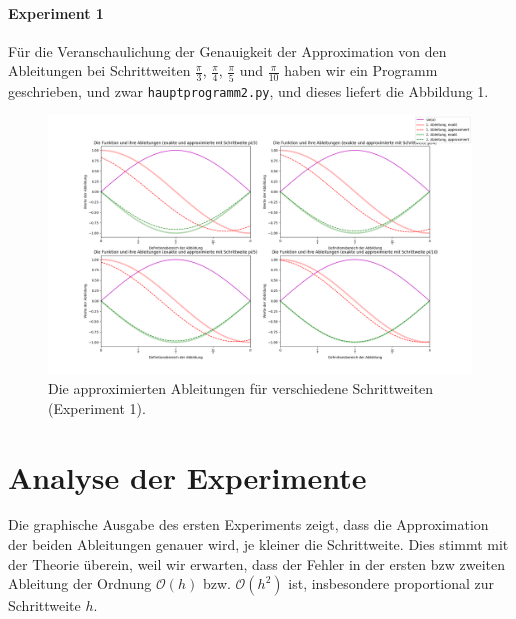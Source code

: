\documentclass[smallheadings]{scrartcl}
\begin{document}
\paragraph {Experiment 1}
Für die Veranschaulichung der Genauigkeit der Approximation von den Ableitungen bei Schrittweiten $\frac{\pi}{3}$, $\frac{\pi}{4}$, $\frac{\pi}{5}$ und $\frac{\pi}{10}$ haben wir ein Programm geschrieben, und zwar \texttt{hauptprogramm2.py}, und dieses liefert die Abbildung 1.

\begin{figure}
	\includegraphics[width=\linewidth]{4Bilder.png}
	\caption{Die approximierten Ableitungen für verschiedene Schrittweiten (Experiment 1).}
	\label{Abbildung 1}
\end{figure}

\section{Analyse der Experimente}

Die graphische Ausgabe des ersten Experiments zeigt, dass die Approximation der beiden Ableitungen genauer wird, je kleiner die Schrittweite. Dies stimmt mit der Theorie überein, weil wir erwarten, dass der Fehler in der ersten bzw zweiten Ableitung der Ordnung $\mathcal{O}(h)$ bzw. $\mathcal{O}(h^2)$ ist, insbesondere proportional zur Schrittweite $h$.

\end{document}

